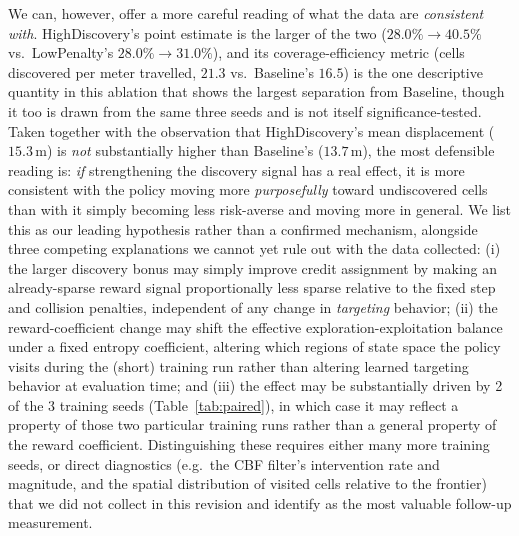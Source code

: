 \documentclass[11pt]{article}
\begin{document}
We can, however, offer a more careful reading of what the data are
\emph{consistent with}. HighDiscovery's point estimate is the larger of
the two ($28.0\%\to40.5\%$ vs.\ LowPenalty's $28.0\%\to31.0\%$), and its
coverage-efficiency metric (cells discovered per meter travelled, $21.3$
vs.\ Baseline's $16.5$) is the one descriptive quantity in this ablation
that shows the largest separation from Baseline, though it too is drawn
from the same three seeds and is not itself significance-tested. Taken
together with the observation that HighDiscovery's mean displacement
($15.3\,$m) is \emph{not} substantially higher than Baseline's
($13.7\,$m), the most defensible reading is: \emph{if} strengthening the
discovery signal has a real effect, it is more consistent with the policy
moving more \emph{purposefully} toward undiscovered cells than with it
simply becoming less risk-averse and moving more in general. We list this
as our leading hypothesis rather than a confirmed mechanism, alongside
three competing explanations we cannot yet rule out with the data
collected: (i) the larger discovery bonus may simply improve credit
assignment by making an already-sparse reward signal proportionally less
sparse relative to the fixed step and collision penalties, independent of
any change in \emph{targeting} behavior; (ii) the reward-coefficient
change may shift the effective exploration-exploitation balance under a
fixed entropy coefficient, altering which regions of state space the
policy visits during the (short) training run rather than altering
learned targeting behavior at evaluation time; and (iii) the effect may
be substantially driven by 2 of the 3 training seeds
(Table~\ref{tab:paired}), in which case it may reflect a property of
those two particular training runs rather than a general property of the
reward coefficient. Distinguishing these requires either many more
training seeds, or direct diagnostics (e.g.\ the CBF filter's
intervention rate and magnitude, and the spatial distribution of visited
cells relative to the frontier) that we did not collect in this revision
and identify as the most valuable follow-up measurement.
\end{document}
